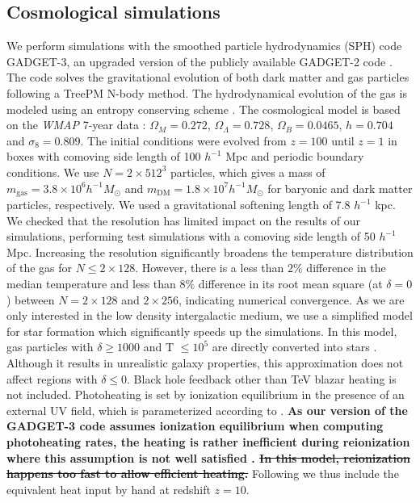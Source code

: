 \documentclass[twocolumns]{emulateapj}
\newcommand\Ec[1]{{\color{magenta} \bf #1}} %
\begin{document}
\subsection{Cosmological simulations}
We perform simulations with the smoothed particle hydrodynamics (SPH) code \textsc{GADGET-3}, an upgraded version of the publicly available \textsc{GADGET-2} code \citep{2005MNRAS.364.1105S}. The code solves the gravitational evolution of both dark matter and gas particles following a TreePM N-body method. The hydrodynamical evolution of the gas is modeled using an entropy conserving scheme \citep{2002MNRAS.333..649S}.
The cosmological model is based on the \textit{WMAP} 7-year data \citep{2011ApJS..192...18K}: $\Omega_M=0.272$, $\Omega_{\Lambda}=0.728$, $\Omega_{B}= 0.0465$, $h=0.704$ and $\sigma_8=0.809$. The initial conditions were evolved from $z=100$ until $z=1$ in boxes with comoving side length of 100 $h^{-1}$ Mpc and periodic boundary conditions. We use $N= 2\times 512^3$ particles, which gives a mass of $m_\mathrm{gas}=3.8\times10^{6} h^{-1} M_{\odot}$ and $m_\mathrm{DM}=1.8\times 10^{7} h^{-1} M_{\odot}$ for baryonic and dark matter particles, respectively. We used a gravitational softening length of 7.8 $h^{-1}$ kpc. We checked that the resolution has limited impact on the results of our simulations, performing test simulations with a comoving side length of 50 $h^{-1}$ Mpc. Increasing the resolution significantly broadens the temperature distribution of the gas for $N\leqslant 2\times 128$. However, there is a less than $2\%$ difference in the median temperature and less than $8\%$ difference in its root mean square (at $\delta=0$) between $N=2\times 128$ and $2\times 256$, indicating numerical convergence.
As we are only interested in the low density intergalactic medium, we use a simplified model for star formation which significantly speeds up the simulations. In this model, gas particles with $\delta\geq 1000$ and T $\leq 10^5$ are directly converted into stars \citep{2004MNRAS.354..684V}. Although it results in unrealistic galaxy properties, this approximation does not affect regions with $\delta \leq 0$. Black hole feedback other than TeV blazar heating is not included. Photoheating is set by ionization equilibrium in the presence of an external UV field, which is parameterized according to \citet{2009ApJ...703.1416F}. \Ec{As our version of the \textsc{GADGET-3} code assumes ionization equilibrium when computing photoheating rates, the heating is rather inefficient during reionization where this assumption is not well satisfied \citep[see e.g.][]{2014arXiv1410.1531P}. \sout{In this model, reionization happens too fast to allow efficient heating.}} Following \citet{2012MNRAS.423..149P} we thus include the equivalent heat input by hand at redshift $z=10$.
\end{document}
